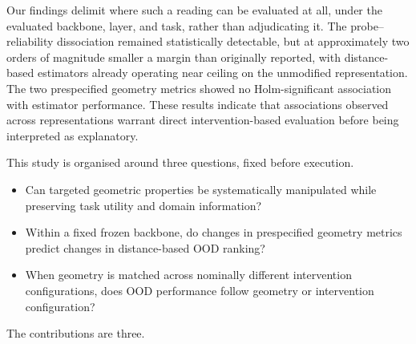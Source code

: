 Our findings delimit where such a reading can be evaluated at all, under the
evaluated backbone, layer, and task, rather than adjudicating it.
The probe--reliability dissociation remained statistically detectable, but at
approximately two orders of magnitude smaller a margin than originally
reported, with distance-based estimators already operating near ceiling on
the unmodified representation. The two prespecified geometry metrics showed
no Holm-significant association with estimator performance. These results
indicate that associations observed across representations warrant direct
intervention-based evaluation before being interpreted as explanatory.

This study is organised around three questions, fixed before execution.

\begin{itemize}
  \item[\textbf{RQ1}] Can targeted geometric properties be systematically
        manipulated while preserving task utility and domain information?
  \item[\textbf{RQ2}] Within a fixed frozen backbone, do changes in
        prespecified geometry metrics predict changes in distance-based OOD
        ranking?
  \item[\textbf{RQ3}] When geometry is matched across nominally different
        intervention configurations, does OOD performance follow geometry or
        intervention configuration?
\end{itemize}

The contributions are three.

